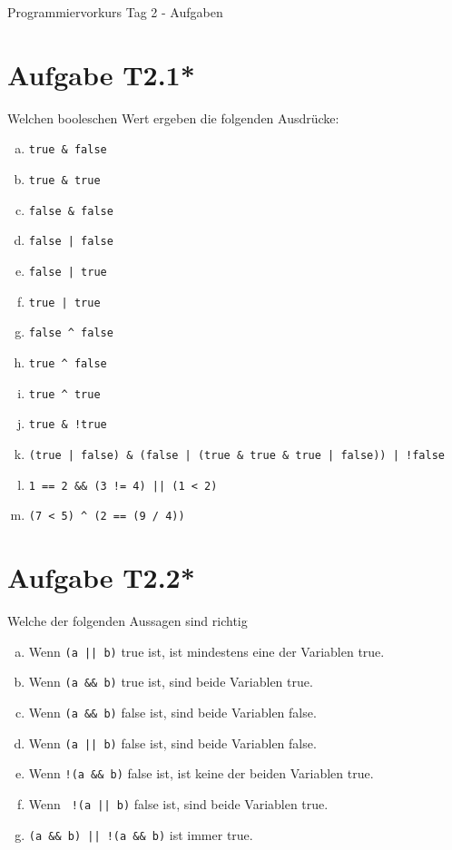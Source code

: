 \documentclass[final,a4paper]{article}
\begin{document}


{\huge Programmiervorkurs Tag 2 - Aufgaben}

\bigskip

\section*{Aufgabe T2.1*}
	Welchen booleschen Wert ergeben die folgenden Ausdrücke:
	\begin{enumerate}[(a)]
		\item \lstinline{true & false}
		\item \lstinline{true & true}
		\item \lstinline{false & false}
		\item \lstinline{false | false}
		\item \lstinline{false | true}
		\item \lstinline{true | true}
		\item \lstinline{false ^ false}
		\item \lstinline{true ^ false}
		\item \lstinline{true ^ true}
		\item \lstinline{true & !true}
		\item \lstinline{(true | false) & (false | (true & true & true | false)) | !false}
		\item \lstinline{1 == 2 && (3 != 4) || (1 < 2)}
		\item \lstinline{(7 < 5) ^ (2 == (9 / 4))}
	\end{enumerate}


\section*{Aufgabe T2.2*}
Welche der folgenden Aussagen sind richtig
\begin{enumerate}[(a)]
\item Wenn \lstinline{(a || b)} true ist, ist mindestens eine der Variablen true.
\item Wenn \lstinline{(a && b)} true ist, sind beide Variablen true.
\item Wenn \lstinline{(a && b)} false ist, sind beide Variablen false.
\item Wenn \lstinline{(a || b)} false ist, sind beide Variablen false.
\item Wenn \lstinline{!(a && b)} false ist, ist keine der beiden Variablen true.
\item Wenn \lstinline{ !(a || b)} false ist, sind beide Variablen true.
\item \lstinline{(a && b) || !(a && b)} ist immer true.
\end{enumerate}
\end{document}
